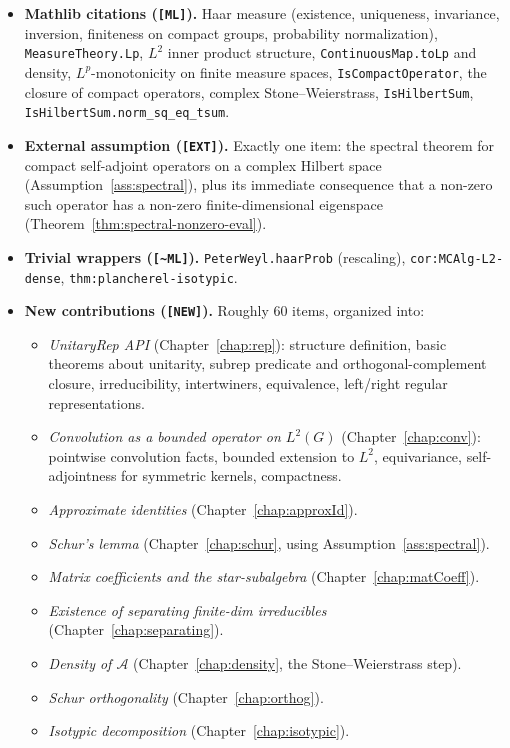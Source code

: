 \begin{itemize}
  \item \textbf{Mathlib citations (\texttt{[ML]}).}
    Haar measure (existence, uniqueness, invariance, inversion,
    finiteness on compact groups, probability normalization),
    \texttt{MeasureTheory.Lp}, $L^2$ inner product structure,
    \texttt{ContinuousMap.toLp} and density, $L^p$-monotonicity on
    finite measure spaces, \texttt{IsCompactOperator}, the closure of
    compact operators, complex Stone--Weierstrass, \texttt{IsHilbertSum},
    \texttt{IsHilbertSum.norm\_sq\_eq\_tsum}.

  \item \textbf{External assumption (\texttt{[EXT]}).}
    Exactly one item: the spectral theorem for compact self-adjoint
    operators on a complex Hilbert space (Assumption~\ref{ass:spectral}),
    plus its immediate consequence that a non-zero such operator has a
    non-zero finite-dimensional eigenspace
    (Theorem~\ref{thm:spectral-nonzero-eval}).

  \item \textbf{Trivial wrappers (\texttt{[\textasciitilde ML]}).}
    \texttt{PeterWeyl.haarProb} (rescaling),
    \texttt{cor:MCAlg-L2-dense},
    \texttt{thm:plancherel-isotypic}.

  \item \textbf{New contributions (\texttt{[NEW]}).}
    Roughly 60 items, organized into:
    \begin{itemize}
      \item \emph{UnitaryRep API} (Chapter~\ref{chap:rep}): structure
        definition, basic theorems about unitarity, subrep predicate
        and orthogonal-complement closure, irreducibility, intertwiners,
        equivalence, left/right regular representations.
      \item \emph{Convolution as a bounded operator on $L^2(G)$}
        (Chapter~\ref{chap:conv}): pointwise convolution facts,
        bounded extension to $L^2$, equivariance, self-adjointness for
        symmetric kernels, compactness.
      \item \emph{Approximate identities} (Chapter~\ref{chap:approxId}).
      \item \emph{Schur's lemma} (Chapter~\ref{chap:schur}, using
        Assumption~\ref{ass:spectral}).
      \item \emph{Matrix coefficients and the star-subalgebra}
        (Chapter~\ref{chap:matCoeff}).
      \item \emph{Existence of separating finite-dim irreducibles}
        (Chapter~\ref{chap:separating}).
      \item \emph{Density of $\mathcal A$} (Chapter~\ref{chap:density},
        the Stone--Weierstrass step).
      \item \emph{Schur orthogonality} (Chapter~\ref{chap:orthog}).
      \item \emph{Isotypic decomposition} (Chapter~\ref{chap:isotypic}).
    \end{itemize}
\end{itemize}

